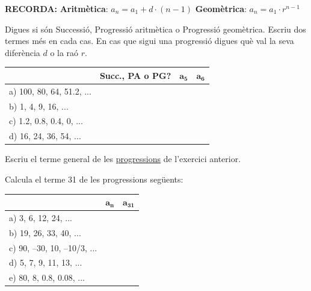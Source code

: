 \begin{extrapage}
	
\setcounter{myenumi}{0}



\begin{center}
	\textbf{RECORDA:} 
	\textbf{Aritmètica}: $a_n=a_1+d\cdot (n-1)$ \qquad \textbf{Geomètrica}: $a_n= a_1 \cdot r^{n-1}$
\end{center}

\begin{mylist}
	
	\item Digues si són Successió, Progressió aritmètica o Progressió geomètrica. Escriu dos termes més en cada cas. En cas que sigui una progressió digues què val la seva diferència $d$ o la raó $r$.
	
	\begin{longtable}{|p{}|p{}|p{}|p{}|} \hline 
	\rowcolor{lightgray}	& \textbf{Succ., PA o PG?} & $\mathbf{a_5}$ & $\mathbf{a_6}$ \\ \hline 
		a) 100, 80, 64, 51.2, ... & & & \\ \hline 
		b) 1, 4, 9, 16, ... & & & \\ \hline 
		c) 1.2, 0.8, 0.4, 0, ...& & & \\ \hline 
		d) 16, 24, 36, 54, ... & & & \\ \hline 
	\end{longtable}

	
	\item Escriu el terme general de les \underline{progressions} de l'exercici anterior.
 	
	\item Calcula el terme 31 de les progressions següents:
	\begin{longtable}{|p{}|p{}|p{}|} \hline 
	\rowcolor{lightgray} & $\mathbf{a_n}$ & $\mathbf{a_{31}}$ \\ \hline 
	a) 3, 6, 12, 24, ... & &  \\ \hline 
	b) 19, 26, 33, 40, ... & &  \\ \hline 
	c) 90, --30, 10, --10/3, ...& &  \\ \hline 
	d) 5, 7, 9, 11, 13, ... & &  \\ \hline 
	e) 80, 8, 0.8, 0.08, ... & &  \\ \hline 
	\end{longtable}	 
	

\end{mylist}
\end{extrapage}
